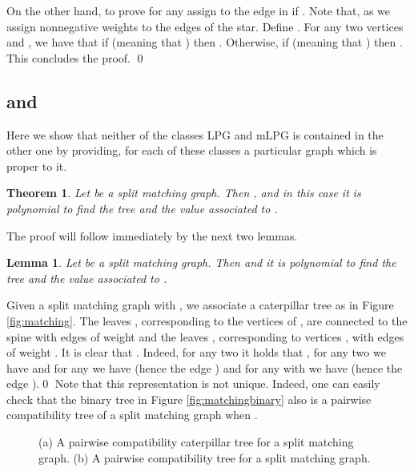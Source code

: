 \documentclass[dvipdfm]{llncs}
\newtheorem{Theorem}{Theorem}
\newtheorem{Lemma}{Lemma}
\begin{document}
On the other hand, to prove  for any  assign  to the edge  in  if .  Note that, as  we assign nonnegative weights to the edges of the star. Define . For any two vertices  and , we have that if  (meaning that ) then . Otherwise, if  (meaning that ) then . This concludes the proof. \qed


\subsection{ and }\label{subsec:proper}

Here we show that neither of the classes LPG and mLPG is contained in the other one by providing, for each of these classes a particular graph which is proper to it. 

\begin{Theorem} \label{theo:splitmatching}
Let  be a split matching graph. Then ,  and in this case it is polynomial to find the tree  and the value  associated to .
\end{Theorem}

The proof will follow immediately by the next two lemmas.

\begin{Lemma}\label{lem:matchingtree}
Let  be a split matching graph. Then  and it is polynomial to find the tree  and the value  associated to .
\end{Lemma}
\proof
Given a split matching graph  with , we associate a caterpillar tree  as in Figure \ref{fig:matching}. The leaves , corresponding to the vertices  of , are connected to the spine with edges of weight  and the leaves , corresponding to vertices , with edges of weight . It is clear that . Indeed, for any two  it holds that , for any two  we have  and for any  we have  (hence the edge ) and for any  with  we have  (hence the edge ).\qed
Note that this representation is not unique. Indeed, one can easily check that the binary tree  in Figure \ref{fig:matchingbinary} also is a pairwise compatibility tree of a split matching graph when . 

\begin{figure}[!ht]
  \begin{center}
  \end{center}
\caption{\footnotesize{(a) A pairwise compatibility caterpillar tree for a split matching graph. (b) A pairwise compatibility tree for a split matching graph.}}
\label{fig:mat}
\end{figure}
\end{document}
